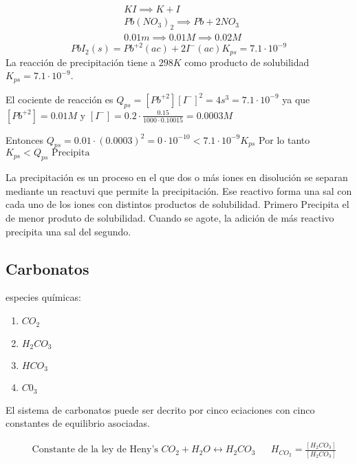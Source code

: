\begin{align*}
	 & KI \implies K+I                   \\
	 & Pb(NO_3)_2 \implies Pb+2NO_3      \\
	 & 0.01m \implies0.01M \implies0.02M
\end{align*}
\begin{equation*}
	PbI_2(s)=Pb^{+2}(ac)+2I^{-}(ac)K_{ps}=7.1\cdot 10^{-9}
\end{equation*}
La reacción de precipitación tiene a $298K$ como producto de solubilidad
$K_{ps}=7.1\cdot10^{-9}$.

El cociente de reacción es $Q_{ps}=[Pb^{+2}][I^-]^2=4s^3=7.1\cdot10^{-9}$
ya que $[Pb^{+2}]=0.01M$ y $[I^-]=0.2\cdot \frac{0.15}{1000\cdot 0.10015}=0.0003M$

Entonces $Q_{ps}=0.01\cdot (0.0003)^2 =0\cdot 10^{-10}<7.1\cdot10^{-9}K_{ps}$
Por lo tanto $K_{ps}<Q_{ps} \text{ Precipita}$

\begin{definition}
	La precipitación es un proceso en el que dos o más iones en disolución se separan mediante un reactuvi que permite
	la precipitación. Ese reactivo forma una sal con cada uno de
	los iones con distintos productos de solubilidad.
	Primero Precipita el de menor produto de solubilidad. Cuando
	se agote, la adición de más reactivo precipita una sal del segundo.
\end{definition}

\subsection{Carbonatos}

especies químicas:

\begin{enumerate}
	\item $CO_2$
	\item $H_2CO_3$
	\item $HCO_3$
	\item $C0_3$
\end{enumerate}

El sistema de carbonatos puede ser decrito por cinco eciaciones con cinco constantes de equilibrio asociadas.

\begin{align}
	 & \text{ Constante de la ley de Heny's } CO_2+H_2O \longleftrightarrow H_2CO_3 &  & H_{CO_2}=\frac{\left[H_2CO_3\right]}{\left[H_2CO_3\right]}
\end{align}

